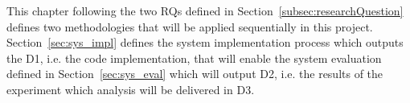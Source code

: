 This chapter following the two \glspl{RQ} defined in Section~\ref{subsec:researchQuestion} defines two methodologies that will be applied sequentially in this project. Section~\ref{sec:sys_impl} defines the system implementation process which outputs the D1, i.e. the code implementation, that will enable the system evaluation defined in Section~\ref{sec:sys_eval} which will output D2, i.e. the results of the experiment which analysis will be delivered in D3.